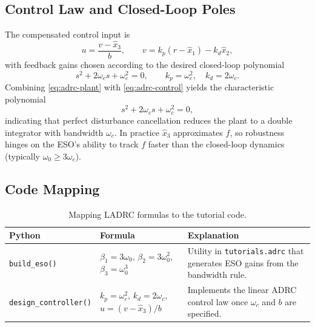\subsection{Control Law and Closed-Loop Poles}
The compensated control input is
\begin{equation}
    u = \frac{v - \hat{x}_3}{b}, \qquad v = k_p (r - \hat{x}_1) - k_d \hat{x}_2,
    \label{eq:adrc-control}
\end{equation}
with feedback gains chosen according to the desired closed-loop polynomial
\begin{equation}
    s^2 + 2 \omega_c s + \omega_c^2 = 0, \qquad k_p = \omega_c^2, \quad k_d = 2 \omega_c.
\end{equation}
Combining \eqref{eq:adrc-plant} with \eqref{eq:adrc-control} yields the characteristic polynomial
\begin{equation}
    s^2 + 2 \omega_c s + \omega_c^2 = 0,
\end{equation}
indicating that perfect disturbance cancellation reduces the plant to a double integrator with bandwidth $\omega_c$. In practice $\hat{x}_3$ approximates $f$, so robustness hinges on the ESO’s ability to track $f$ faster than the closed-loop dynamics (typically $\omega_0 \geq 3 \omega_c$).

\subsection{Code Mapping}
\begin{table}[h]
    \centering
    \small
    \renewcommand{\arraystretch}{1.2}
    \begin{tabularx}{\linewidth}{|>{\raggedright\arraybackslash}p{4cm}|X|X|}
        \hline
        \textbf{Python} & \textbf{Formula} & \textbf{Explanation} \\
        \hline
        \texttt{build\_eso()} & $\beta_1 = 3\omega_0$, $\beta_2 = 3\omega_0^2$, $\beta_3 = \omega_0^3$ & Utility in \texttt{tutorials.adrc} that generates ESO gains from the bandwidth rule. \\
        \hline
        \texttt{design\_controller()} & $k_p = \omega_c^2$, $k_d = 2\omega_c$, $u = (v - \hat{x}_3)/b$ & Implements the linear ADRC control law once $\omega_c$ and $b$ are specified. \\
        \hline
    \end{tabularx}
    \caption{Mapping LADRC formulas to the tutorial code.}
\end{table}

